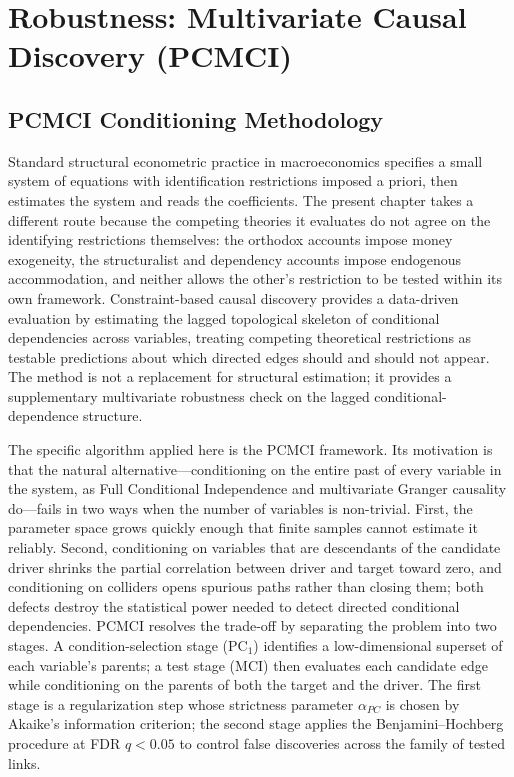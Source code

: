 \section{Robustness: Multivariate Causal Discovery (PCMCI)}
\label{app:pcmci_ee1}
\label{app:causal_pcmci_ee1}

\subsection{PCMCI Conditioning Methodology}
Standard structural econometric practice in macroeconomics specifies a small system of equations with identification restrictions imposed a priori, then estimates the system and reads the coefficients. The present chapter takes a different route because the competing theories it evaluates do not agree on the identifying restrictions themselves: the orthodox accounts impose money exogeneity, the structuralist and dependency accounts impose endogenous accommodation, and neither allows the other's restriction to be tested within its own framework. Constraint-based causal discovery provides a data-driven evaluation by estimating the lagged topological skeleton of conditional dependencies across variables, treating competing theoretical restrictions as testable predictions about which directed edges should and should not appear. The method is not a replacement for structural estimation; it provides a supplementary multivariate robustness check on the lagged conditional-dependence structure.

The specific algorithm applied here is the \citet{Runge2019} PCMCI framework. Its motivation is that the natural alternative---conditioning on the entire past of every variable in the system, as Full Conditional Independence and multivariate Granger causality do---fails in two ways when the number of variables is non-trivial. First, the parameter space grows quickly enough that finite samples cannot estimate it reliably. Second, conditioning on variables that are descendants of the candidate driver shrinks the partial correlation between driver and target toward zero, and conditioning on colliders opens spurious paths rather than closing them; both defects destroy the statistical power needed to detect directed conditional dependencies. PCMCI resolves the trade-off by separating the problem into two stages. A condition-selection stage (PC$_1$) identifies a low-dimensional superset of each variable's parents; a test stage (MCI) then evaluates each candidate edge while conditioning on the parents of both the target and the driver. The first stage is a regularization step whose strictness parameter $\alpha_{PC}$ is chosen by Akaike's information criterion; the second stage applies the Benjamini--Hochberg procedure at FDR $q < 0.05$ to control false discoveries across the family of tested links.

